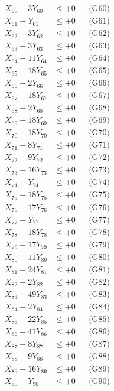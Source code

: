 \documentclass[a4paper,10pt]{article}
\begin{document}
{\begin{align}
X_{60} - 3Y_{60} &\leq +0 && \text{(G60)} \\
X_{61} - Y_{61} &\leq +0 && \text{(G61)} \\
X_{62} - 3Y_{62} &\leq +0 && \text{(G62)} \\
X_{63} - 3Y_{63} &\leq +0 && \text{(G63)} \\
X_{64} - 11Y_{64} &\leq +0 && \text{(G64)} \\
X_{65} - 18Y_{65} &\leq +0 && \text{(G65)} \\
X_{66} - 2Y_{66} &\leq +0 && \text{(G66)} \\
X_{67} - 18Y_{67} &\leq +0 && \text{(G67)} \\
\allowbreak
X_{68} - 2Y_{68} &\leq +0 && \text{(G68)} \\
X_{69} - 18Y_{69} &\leq +0 && \text{(G69)} \\
X_{70} - 18Y_{70} &\leq +0 && \text{(G70)} \\
X_{71} - 8Y_{71} &\leq +0 && \text{(G71)} \\
X_{72} - 9Y_{72} &\leq +0 && \text{(G72)} \\
X_{73} - 16Y_{73} &\leq +0 && \text{(G73)} \\
X_{74} - Y_{74} &\leq +0 && \text{(G74)} \\
X_{75} - 18Y_{75} &\leq +0 && \text{(G75)} \\
X_{76} - 17Y_{76} &\leq +0 && \text{(G76)} \\
X_{77} - Y_{77} &\leq +0 && \text{(G77)} \\
\allowbreak
X_{78} - 18Y_{78} &\leq +0 && \text{(G78)} \\
X_{79} - 17Y_{79} &\leq +0 && \text{(G79)} \\
X_{80} - 11Y_{80} &\leq +0 && \text{(G80)} \\
X_{81} - 24Y_{81} &\leq +0 && \text{(G81)} \\
X_{82} - 2Y_{82} &\leq +0 && \text{(G82)} \\
X_{83} - 49Y_{83} &\leq +0 && \text{(G83)} \\
X_{84} - 2Y_{84} &\leq +0 && \text{(G84)} \\
X_{85} - 22Y_{85} &\leq +0 && \text{(G85)} \\
X_{86} - 41Y_{86} &\leq +0 && \text{(G86)} \\
X_{87} - 8Y_{87} &\leq +0 && \text{(G87)} \\
\allowbreak
X_{88} - 9Y_{88} &\leq +0 && \text{(G88)} \\
X_{89} - 16Y_{89} &\leq +0 && \text{(G89)} \\
X_{90} - Y_{90} &\leq +0 && \text{(G90)} \\

\end{align}}
\end{document}
